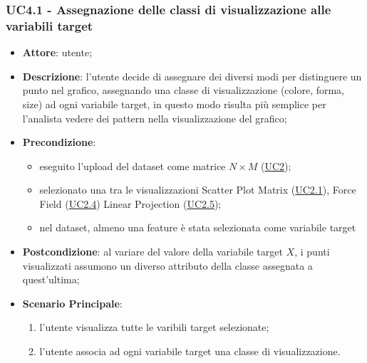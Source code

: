  \subsubsection{UC4.1 - Assegnazione delle classi di visualizzazione alle variabili target}
    \label{uc4.1}
    \begin{itemize}
    \item \textbf{Attore}: utente;
    \item \textbf{Descrizione}: l'utente decide di assegnare dei diversi modi per distinguere un punto nel grafico, assegnando una classe di visualizzazione (colore, forma, size) ad ogni variabile target, in questo modo risulta più semplice per l'analista vedere dei pattern nella visualizzazione del grafico;
    \item \textbf{Precondizione}:
    \begin{itemize}
        \item eseguito l'upload del dataset come matrice $N\times M$ (\hyperref[uc2]{UC2});
        \item selezionato una tra le visualizzazioni Scatter Plot Matrix (\hyperref[uc2.1]{UC2.1}), Force Field (\hyperref[uc2.4]{UC2.4}) Linear Projection (\hyperref[uc2.5]{UC2.5});
        \item nel dataset, almeno una feature è stata selezionata come variabile target
    \end{itemize}
    \item \textbf{Postcondizione}: al variare del valore della variabile target $X$, i punti visualizzati assumono un diverso attributo della classe assegnata a quest'ultima;
    \item \textbf{Scenario Principale}: 
    \begin{enumerate}
        \item l'utente visualizza tutte le varibili target selezionate;
        \item l'utente associa ad ogni variabile target una classe di visualizzazione.
    \end{enumerate}  
    \end{itemize}
    
